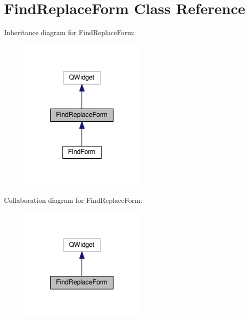\hypertarget{classFindReplaceForm}{}\section{Find\+Replace\+Form Class Reference}
\label{classFindReplaceForm}


Inheritance diagram for Find\+Replace\+Form\+:\nopagebreak
\begin{figure}[H]
\begin{center}
\leavevmode
\includegraphics[width=174pt]{classFindReplaceForm__inherit__graph}
\end{center}
\end{figure}


Collaboration diagram for Find\+Replace\+Form\+:\nopagebreak
\begin{figure}[H]
\begin{center}
\leavevmode
\includegraphics[width=174pt]{classFindReplaceForm__coll__graph}
\end{center}
\end{figure}
